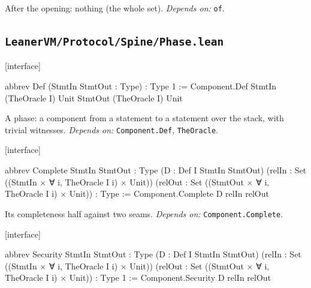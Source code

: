 After the opening: nothing (the whole set). \emph{Depends on:} \texttt{of}.

\subsection{\texttt{LeanerVM/Protocol/Spine/Phase.lean}}\label{sec:gen-cat-spine-Phase}

\par\medskip\noindent\textbf{}\hfill\textsf{\small [interface]}\par\nopagebreak

\begin{leancode}
abbrev Def (StmtIn StmtOut : Type) : Type 1 :=
  Component.Def StmtIn (TheOracle I) Unit StmtOut (TheOracle I) Unit
\end{leancode}


A phase: a component from a statement to a statement over the stack, with trivial witnesses. \emph{Depends on:} \texttt{Component.\allowbreak{}Def}, \texttt{TheOracle}.

\par\medskip\noindent\textbf{}\hfill\textsf{\small [interface]}\par\nopagebreak

\begin{leancode}
abbrev Complete {StmtIn StmtOut : Type} (D : Def I StmtIn StmtOut)
    (relIn : Set ((StmtIn × ∀ i, TheOracle I i) × Unit))
    (relOut : Set ((StmtOut × ∀ i, TheOracle I i) × Unit)) : Type :=
  Component.Complete D relIn relOut
\end{leancode}


Its completeness half against two seams. \emph{Depends on:} \texttt{Component.\allowbreak{}Complete}.

\par\medskip\noindent\textbf{}\hfill\textsf{\small [interface]}\par\nopagebreak

\begin{leancode}
abbrev Security {StmtIn StmtOut : Type} (D : Def I StmtIn StmtOut)
    (relIn : Set ((StmtIn × ∀ i, TheOracle I i) × Unit))
    (relOut : Set ((StmtOut × ∀ i, TheOracle I i) × Unit)) : Type 1 :=
  Component.Security D relIn relOut
\end{leancode}

